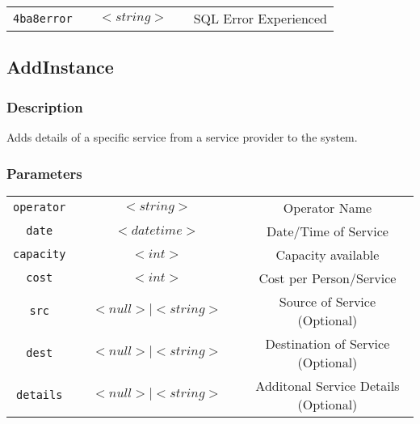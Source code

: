 \begin{tabular}{ccccc}
\verb!4ba8error! & \vspace{15mm} & $<string>$ & \vspace{15mm} & SQL Error Experienced \\
\end{tabular}


\subsection{AddInstance}

\subsubsection{Description}

Adds details of a specific service from a service provider to the
system.  

\subsubsection{Parameters}

\begin{tabular}{ccccc}
\verb!operator! & \vspace{15mm} & $<string>$ 	& \vspace{15mm} & Operator Name \\
\verb!date! 	 & \vspace{15mm} & $<datetime>$ & \vspace{15mm} & Date/Time of Service\\
\verb!capacity! & \vspace{15mm} & $<int>$ 		& \vspace{15mm} & Capacity available \\
\verb!cost! 	 & \vspace{15mm} & $<int>$ 		& \vspace{15mm} & Cost per Person/Service \\
\verb!src! 		 & \vspace{15mm} & $<null> \mid <string>$ & \vspace{15mm} & Source of Service (Optional) \\
\verb!dest! 	 & \vspace{15mm} & $<null> \mid <string>$ & \vspace{15mm} & Destination of Service (Optional) \\
\verb!details!  & \vspace{15mm} & $<null> \mid <string>$ & \vspace{15mm} & Additonal Service Details (Optional) \\
\end{tabular}

